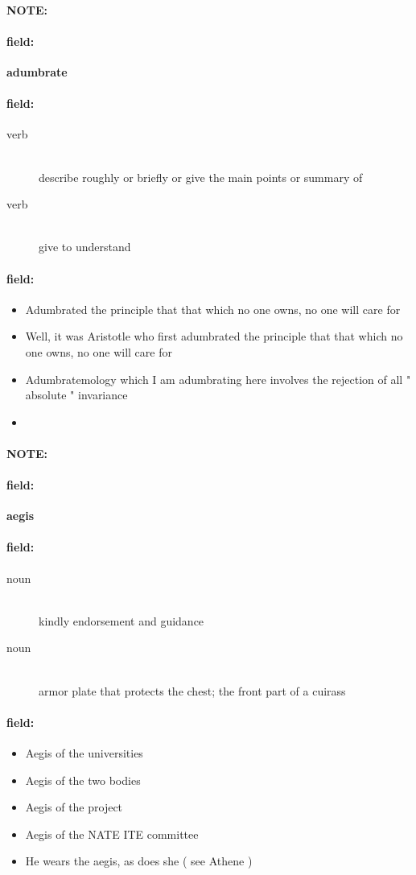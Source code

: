 \documentclass[12pt]{article}
\newenvironment{note}{\paragraph{NOTE:}}{}
\newenvironment{field}{\paragraph{field:}}{}
\begin{document}
\begin{note}
\begin{field}
\textbf{\large adumbrate}
\end{field}


\begin{field}
\begin{description}
\item[verb] \hfill \\ 
describe roughly or briefly or give the main points or summary of

\item[verb] \hfill \\ 
give to understand

\end{description}
\end{field}

\begin{field}
\begin{itemize}
\item Adumbrated the principle that that which no one owns, no one will care for
\item Well, it was Aristotle who first adumbrated the principle that that which no one owns, no one will care for
\item Adumbratemology which I am adumbrating here involves the rejection of all " absolute " invariance
\item 
\end{itemize}
\end{field}
\end{note}
\begin{note}
\begin{field}
\textbf{\large aegis}
\end{field}


\begin{field}
\begin{description}
\item[noun] \hfill \\ 
kindly endorsement and guidance

\item[noun] \hfill \\ 
armor plate that protects the chest; the front part of a cuirass

\end{description}
\end{field}

\begin{field}
\begin{itemize}
\item Aegis of the universities
\item Aegis of the two bodies
\item Aegis of the project
\item Aegis of the NATE ITE committee
\item He wears the aegis, as does she ( see Athene )
\end{itemize}
\end{field}
\end{note}
\end{document}
